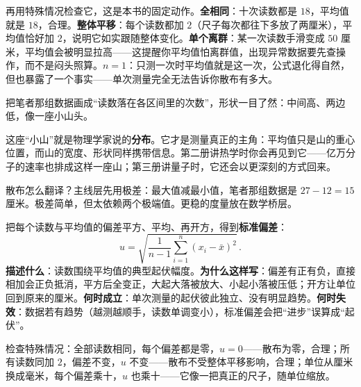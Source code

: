 再用特殊情况检查它，这是本书的固定动作。\textbf{全相同}：十次读数都是 \(18\)，平均值就是 \(18\)，合理。\textbf{整体平移}：每个读数都加 \(2\)（尺子每次都往下多放了两厘米），平均值恰好加 \(2\)，说明它如实跟随整体变化。\textbf{单个离群}：某一次读数手滑变成 \(50\) 厘米，平均值会被明显拉高——这提醒你平均值怕离群值，出现异常数据要先查操作，而不是闷头照算。\textbf{\(n=1\)}：只测一次时平均值就是这一次，公式退化得自然，但也暴露了一个事实——单次测量完全无法告诉你散布有多大。

把笔者那组数据画成“读数落在各区间里的次数”，形状一目了然：中间高、两边低，像一座小山头。

\begin{center}
\end{center}

这座“小山”就是物理学家说的\textbf{分布}。它才是测量真正的主角：平均值只是山的重心位置，而山的宽度、形状同样携带信息。第二册讲热学时你会再见到它——亿万分子的速率也排成这样一座山；第三册讲量子时，它还会以更深刻的方式回来。

散布怎么翻译？主线层先用极差：最大值减最小值，笔者那组数据是 \(27-12=15\) 厘米。极差简单，但太依赖两个极端值。更稳的度量放在数学桥层。

\begin{mathbridge}
把每个读数与平均值的偏差平方、平均、再开方，得到\textbf{标准偏差}：
\[
u=\sqrt{\frac{1}{n-1}\sum_{i=1}^{n}\left(x_i-\bar{x}\right)^2}\,.
\]
\textbf{描述什么}：读数围绕平均值的典型起伏幅度。\textbf{为什么这样写}：偏差有正有负，直接相加会正负抵消，平方后全变正，大起大落被放大、小起小落被压低；开方让单位回到原来的厘米。\textbf{何时成立}：单次测量的起伏彼此独立、没有明显趋势。\textbf{何时失效}：数据若有趋势（越测越顺手，读数单调变小），标准偏差会把“进步”误算成“起伏”。

检查特殊情况：全部读数相同，每个偏差都是零，\(u=0\)——散布为零，合理；所有读数同加 \(2\)，偏差不变，\(u\) 不变——散布不受整体平移影响，合理；单位从厘米换成毫米，每个偏差乘十，\(u\) 也乘十——它像一把真正的尺子，随单位缩放。
\end{mathbridge}

